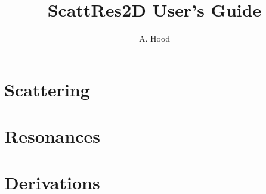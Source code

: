 \documentclass[letterpaper,12pt]{article}
\begin{document}
\title{ScattRes2D User's Guide}
\author{A. Hood}

\maketitle
\tableofcontents



\break


\part{Scattering}












\part{Resonances}







\part{Derivations}













\end{document}
